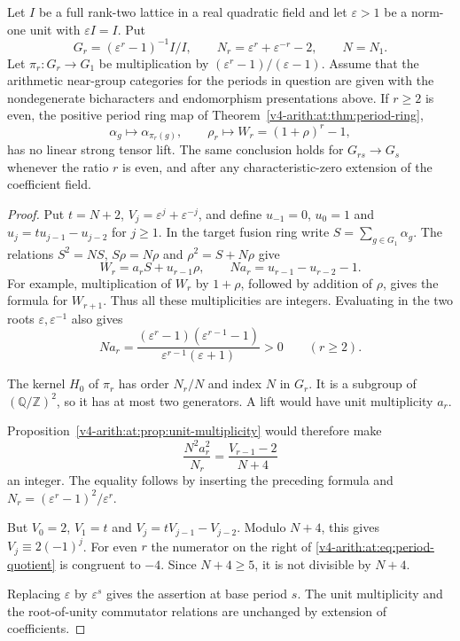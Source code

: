\begin{theorem}
\label{v4-arith:at:thm:even-periods}
Let $I$ be a full rank-two lattice in a real quadratic field and let
$\varepsilon>1$ be a norm-one unit with $\varepsilon I=I$.
Put
\[
 G_r=(\varepsilon^r-1)^{-1}I/I,\qquad
 N_r=\varepsilon^r+\varepsilon^{-r}-2,
 \qquad N=N_1.
\]
Let $\pi_r:G_r\to G_1$ be multiplication by
$(\varepsilon^r-1)/(\varepsilon-1)$.
Assume that the arithmetic near-group categories for the periods in
question are given with the nondegenerate bicharacters and
endomorphism presentations above. If $r\ge2$ is even, the positive
period ring map of Theorem~\ref{v4-arith:at:thm:period-ring},
\[
 \alpha_g\longmapsto\alpha_{\pi_r(g)},\qquad
 \rho_r\longmapsto W_r=(1+\rho)^r-1,
\]
has no linear strong tensor lift. The same conclusion holds for
$G_{rs}\to G_s$ whenever the ratio $r$ is even, and after any
characteristic-zero extension of the coefficient field.
\end{theorem}
\begin{proof}
Put $t=N+2$, $V_j=\varepsilon^j+\varepsilon^{-j}$, and define
$u_{-1}=0$, $u_0=1$ and $u_j=tu_{j-1}-u_{j-2}$ for $j\ge1$.
In the target fusion ring write $S=\sum_{g\in G_1}\alpha_g$.
The relations $S^2=NS$, $S\rho=N\rho$ and $\rho^2=S+N\rho$ give
\begin{equation}\label{v4-arith:at:eq:period-multiplicity}
 W_r=a_rS+u_{r-1}\rho,
 \qquad Na_r=u_{r-1}-u_{r-2}-1.
\end{equation}
For example, multiplication of $W_r$ by $1+\rho$, followed by
addition of $\rho$, gives the formula for $W_{r+1}$. Thus all these
multiplicities are integers. Evaluating in the two roots
$\varepsilon,\varepsilon^{-1}$ also gives
\[
 Na_r=\frac{(\varepsilon^r-1)(\varepsilon^{r-1}-1)}
                  {\varepsilon^{r-1}(\varepsilon+1)}>0
 \qquad(r\ge2).
\]

The kernel $H_0$ of $\pi_r$ has order $N_r/N$ and index $N$ in
$G_r$. It is a subgroup of $(\mathbb Q/\mathbb Z)^2$, so it has at
most two generators. A lift would have unit multiplicity $a_r$.

Proposition~\ref{v4-arith:at:prop:unit-multiplicity} would therefore make
\begin{equation}\label{v4-arith:at:eq:period-quotient}
 \frac{N^2a_r^2}{N_r}
     =\frac{V_{r-1}-2}{N+4}
\end{equation}
an integer. The equality follows by inserting the preceding formula
and $N_r=(\varepsilon^r-1)^2/\varepsilon^r$.

But $V_0=2$, $V_1=t$ and $V_j=tV_{j-1}-V_{j-2}$. Modulo $N+4$,
this gives $V_j\equiv2(-1)^j$. For even $r$ the numerator on the
right of \eqref{v4-arith:at:eq:period-quotient} is congruent to $-4$.
Since $N+4\ge5$, it is not divisible by $N+4$.

Replacing $\varepsilon$ by $\varepsilon^s$ gives the assertion at
base period $s$. The unit multiplicity and the root-of-unity
commutator relations are unchanged by extension of coefficients.
\end{proof}

